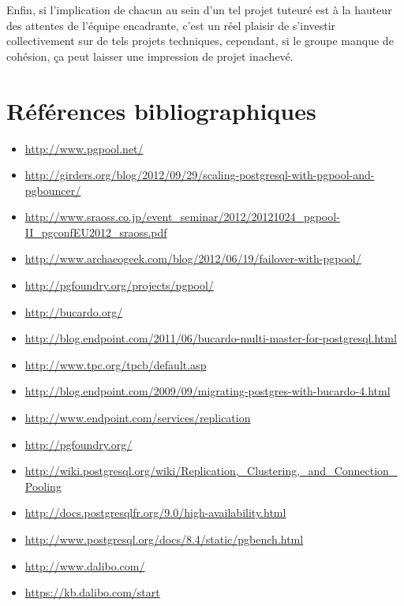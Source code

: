 \documentclass[12pt]{report}
\begin{document}
Enfin, si l'implication de chacun au sein d'un tel projet tuteuré est à la
hauteur des attentes de l'équipe encadrante, c'est un réel plaisir de s'investir
collectivement sur de tels projets techniques, cependant, si le groupe manque de
cohésion, ça peut laisser une impression de projet inachevé.\\

\setcounter{section}{0}

\chapter*{Références bibliographiques}

\begin{itemize}
\item \url{http://www.pgpool.net/}
\item \url{http://girders.org/blog/2012/09/29/scaling-postgresql-with-pgpool-and-pgbouncer/}
\item
  \url{http://www.sraoss.co.jp/event_seminar/2012/20121024_pgpool-II_pgconfEU2012_sraoss.pdf}
\item \url{http://www.archaeogeek.com/blog/2012/06/19/failover-with-pgpool/}
\item \url{http://pgfoundry.org/projects/pgpool/}
\item \url{http://bucardo.org/}
\item \url{http://blog.endpoint.com/2011/06/bucardo-multi-master-for-postgresql.html}
\item \url{http://www.tpc.org/tpcb/default.asp}
\item \url{http://blog.endpoint.com/2009/09/migrating-postgres-with-bucardo-4.html}
\item \url{http://www.endpoint.com/services/replication}
\item \url{http://pgfoundry.org/}
\item \url{http://wiki.postgresql.org/wiki/Replication,_Clustering,\_and\_Connection_Pooling}
\item \url{http://docs.postgresqlfr.org/9.0/high-availability.html}
\item \url{http://www.postgresql.org/docs/8.4/static/pgbench.html}
\item \url{http://www.dalibo.com/}
\item \url{https://kb.dalibo.com/start}
\end{itemize}

\setcounter{section}{0}
\end{document}
